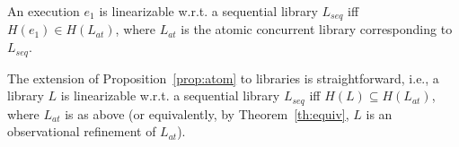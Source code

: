 \begin{proposition}
  \label{prop:atom}

  An execution $e_1$ is linearizable w.r.t. a sequential library $L_{seq}$ iff
  $H(e_1)\in H(L_{at})$, where $L_{at}$ is the atomic concurrent library
  corresponding to $L_{seq}$.

\end{proposition}

The extension of Proposition~\ref{prop:atom} to libraries is straightforward,
i.e., a library $L$ is linearizable w.r.t. a sequential library $L_{seq}$ iff
$H(L)\subseteq H(L_{at})$, where $L_{at}$ is as above (or equivalently, by
Theorem~\ref{th:equiv}, $L$ is an observational refinement of $L_{at}$).
